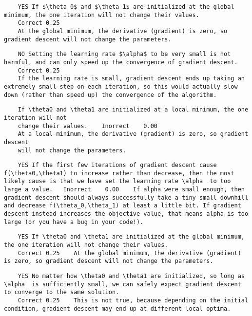 \documentclass[11pt]{article} %
\begin{document}
	\begin{verbatim}
	YES If $\theta_0$ and $\theta_1$ are initialized at the global minimum, the one iteration will not change their values.	
	Correct	0.25	
	At the global minimum, the derivative (gradient) is zero, so gradient descent will not change the parameters.
	\end{verbatim}
	
	\begin{verbatim}
	NO Setting the learning rate $\alpha$ to be very small is not harmful, and can only speed up the convergence of gradient descent.	
	Correct	0.25	
	If the learning rate is small, gradient descent ends up taking an extremely small step on each iteration, so this would actually slow down (rather than speed up) the convergence of the algorithm.
	\end{verbatim}
	
	\begin{verbatim}
	If \theta0 and \theta1 are initialized at a local minimum, the one iteration will not 
	change their values.	Inorrect	0.00	
	At a local minimum, the derivative (gradient) is zero, so gradient descent 
	will not change the parameters.
	\end{verbatim}
	
	\begin{verbatim}
	YES If the first few iterations of gradient descent cause f(\theta0,\theta1) to increase rather than decrease, then the most likely cause is that we have set the learning rate \alpha  to too large a value.	Inorrect	0.00	If alpha were small enough, then gradient descent should always successfully take a tiny small downhill and decrease f(\theta_0,\theta_1) at least a little bit. If gradient descent instead increases the objective value, that means alpha is too large (or you have a bug in your code!).
	\end{verbatim}
	
	\begin{verbatim}
	YES If \theta0 and \theta1 are initialized at the global minimum, the one iteration will not change their values.	
	Correct	0.25	At the global minimum, the derivative (gradient) is zero, so gradient descent will not change the parameters.
	\end{verbatim}
	
	\begin{verbatim}
	YES No matter how \theta0 and \theta1 are initialized, so long as \alpha  is sufficiently small, we can safely expect gradient descent to converge to the same solution.	
	Correct	0.25	This is not true, because depending on the initial condition, gradient descent may end up at different local optima.
	\end{verbatim}
	
\end{document}
